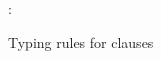 \begin{figure}[H]
\flushleft {}
\begin{smathpar}
{
   \Gamma \vdash {} : 
}
\end{smathpar}
\caption{Typing rules for clauses}
\end{figure}
